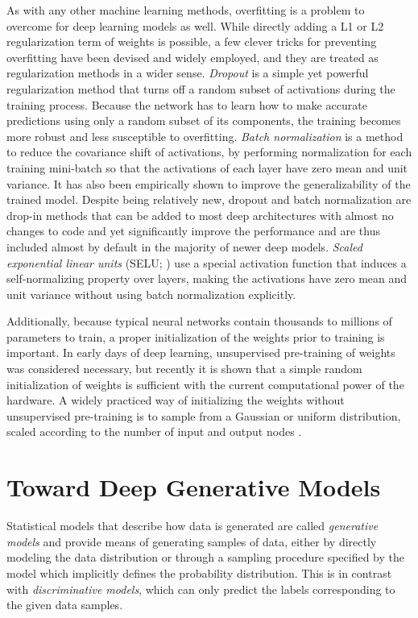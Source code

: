 As with any other machine learning methods, overfitting is a problem to overcome for deep learning models as well.
While directly adding a L1 or L2 regularization term of weights is possible, a few clever tricks for preventing overfitting have been devised and widely employed, and they are treated as regularization methods in a wider sense.
\emph{Dropout} \cite{srivastava2014dropout} is a simple yet powerful regularization method that turns off a random subset of activations during the training process.
Because the network has to learn how to make accurate predictions using only a random subset of its components, the training becomes more robust and less susceptible to overfitting.
\emph{Batch normalization} \cite{ioffe2015batchnorm} is a method to reduce the covariance shift of activations, by performing normalization for each training mini-batch so that the activations of each layer have zero mean and unit variance.
It has also been empirically shown to improve the generalizability of the trained model.
Despite being relatively new, dropout and batch normalization are drop-in methods that can be added to most deep architectures with almost no changes to code and yet significantly improve the performance and are thus included almost by default in the majority of newer deep models.
\emph{Scaled exponential linear units} (SELU; ) use a special activation function that induces a self-normalizing property over layers, making the activations have zero mean and unit variance without using batch normalization explicitly.


Additionally, because typical neural networks contain thousands to millions of parameters to train, a proper initialization of the weights prior to training is important.
In early days of deep learning, unsupervised pre-training of weights \cite{bengio2007greedy,erhan2010pretraining} was considered necessary, but recently it is shown that a simple random initialization of weights is sufficient with the current computational power of the hardware.
A widely practiced way of initializing the weights without unsupervised pre-training is to sample from a Gaussian or uniform distribution, scaled according to the number of input and output nodes \cite{glorot2010initialization,he2015prelu}.


\section{Toward Deep Generative Models}

Statistical models that describe how data is generated are called \emph{generative models} and provide means of generating samples of data, either by directly modeling the data distribution or through a sampling procedure specified by the model which implicitly defines the probability distribution.
This is in contrast with \emph{discriminative models}, which can only predict the labels corresponding to the given data samples.

